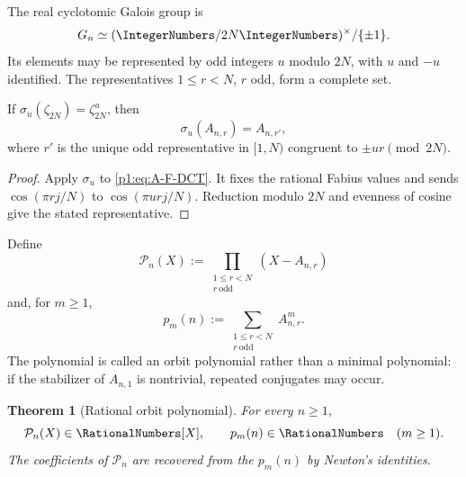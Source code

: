 \documentclass[11pt,oneside]{article}
\newtheorem{theorem}{Theorem}[section]
\theoremstyle{definition}
\theoremstyle{remark}
\begin{document}
The real cyclotomic Galois group is
\begin{equation}\label{p1:eq:G-n}
 G_n\simeq(\IntegerNumbers/2N\IntegerNumbers)^{\times}/\{\pm1\}.
\end{equation}
Its elements may be represented by odd integers $u$ modulo $2N$, with $u$ and
$-u$ identified.  The representatives $1\le r<N$, $r$ odd, form a complete
set.

\begin{proposition}\label{p1:prop:Galois-action}
If $\sigma_u(\zeta_{2N})=\zeta_{2N}^u$, then
\begin{equation}\label{p1:eq:Galois-action}
 \sigma_u(A_{n,r})=A_{n,r'},
\end{equation}
where $r'$ is the unique odd representative in $[1,N)$ congruent to
$\pm ur\pmod{2N}$.
\end{proposition}

\begin{proof}
Apply $\sigma_u$ to \eqref{p1:eq:A-F-DCT}.  It fixes the rational Fabius values and
sends
$\cos(\pi rj/N)$ to $\cos(\pi urj/N)$.  Reduction modulo $2N$ and evenness of
cosine give the stated representative.
\end{proof}

\begin{definition}\label{p1:def:orbit-poly}
Define
\begin{equation}\label{p1:eq:orbit-poly}
 \mathcal P_n(X):=
 \prod_{\substack{1\le r<N\\r\ \mathrm{odd}}}(X-A_{n,r})
\end{equation}
and, for $m\ge1$,
\begin{equation}\label{p1:eq:p-m-n}
 p_m(n):=\sum_{\substack{1\le r<N\\r\ \mathrm{odd}}}A_{n,r}^m.
\end{equation}
The polynomial is called an orbit polynomial rather than a minimal polynomial:
if the stabilizer of $A_{n,1}$ is nontrivial, repeated conjugates may occur.
\end{definition}

\begin{theorem}[Rational orbit polynomial]\label{p1:thm:rational-orbit-poly}
For every $n\ge1$,
\begin{equation}\label{p1:eq:orbit-poly-rational}
 \mathcal P_n(X)\in\RationalNumbers[X],
 \qquad
 p_m(n)\in\RationalNumbers\quad(m\ge1).
\end{equation}
The coefficients of $\mathcal P_n$ are recovered from the $p_m(n)$ by Newton's
identities.
\end{theorem}
\end{document}
